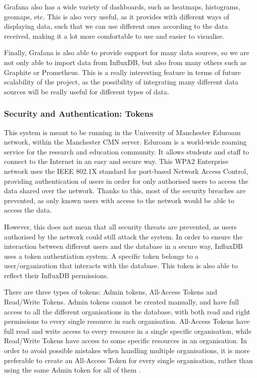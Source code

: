 \documentclass[12pt]{article}
\begin{document}
Grafana also has a wide variety of dashboards, such as heatmaps, histograms, geomaps, etc. This is also very useful, as it provides with different ways of displaying data, such that we can use different ones according to the data received, making it a lot more comfortable to use and easier to visualise.\par

Finally, Grafana is also able to provide support for many data sources, so we are not only able to import data from InfluxDB, but also from many others such as Graphite or Prometheus. This is a really interesting feature in terms of future scalability of the project, as the possibility of integrating many different data sources will be really useful for different types of data.

\subsubsection{Security and Authentication: Tokens}

This system is meant to be running in the University of Manchester Eduroam network, within the Manchester CMN server. Eduroam is a world-wide roaming service for the research and education community. It allows students and staff to connect to the Internet in an easy and secure way. This WPA2 Enterprise network uses the IEEE 802.1X standard for port-based Network Access Control, providing authentication of users in order for only authorised users to access the data shared over the network. Thanks to this, most of the security breaches are prevented, as only known users with access to the network would be able to access the data. \par 

However, this does not mean that all security threats are prevented, as users authorised by the network could still attack the system. In order to ensure the interaction between different users and the database in a secure way, InfluxDB uses a token authentiation system. A specific token belongs to a user/organization that interacts with the database. This token is also able to reflect their InfluxDB permissions.\par

There are three types of tokens: Admin tokens, All-Access Tokens and Read/Write Tokens. Admin tokens cannot be created manually, and have full access to all the different organisations in the database, with both read and right permissions to every single resource in each organisation. All-Access Tokens have full read and write access to every resource in a single specific organisation, while Read/Write Tokens have access to some specific resources in an organisation. In order to avoid possible mistakes when handling multiple organisations, it is more preferable to create an All-Access Token for every single organisation, rather than using the same Admin token for all of them \cite{influx:tokens}.\par
\end{document}
